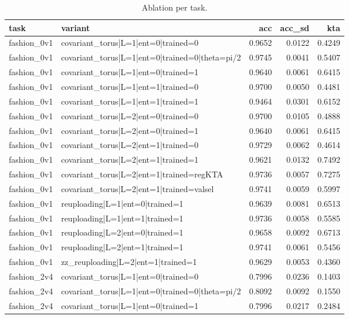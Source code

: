\begin{table}
\caption{Ablation per task.}
\label{tab:table3_ablation_per_task}
\begin{tabular}{llrrr}
\toprule
task & variant & acc & acc\_sd & kta \\
\midrule
fashion\_0v1 & covariant\_torus|L=1|ent=0|trained=0 & 0.9652 & 0.0122 & 0.4249 \\
fashion\_0v1 & covariant\_torus|L=1|ent=0|trained=0|theta=pi/2 & 0.9745 & 0.0041 & 0.5407 \\
fashion\_0v1 & covariant\_torus|L=1|ent=0|trained=1 & 0.9640 & 0.0061 & 0.6415 \\
fashion\_0v1 & covariant\_torus|L=1|ent=1|trained=0 & 0.9700 & 0.0050 & 0.4481 \\
fashion\_0v1 & covariant\_torus|L=1|ent=1|trained=1 & 0.9464 & 0.0301 & 0.6152 \\
fashion\_0v1 & covariant\_torus|L=2|ent=0|trained=0 & 0.9700 & 0.0105 & 0.4888 \\
fashion\_0v1 & covariant\_torus|L=2|ent=0|trained=1 & 0.9640 & 0.0061 & 0.6415 \\
fashion\_0v1 & covariant\_torus|L=2|ent=1|trained=0 & 0.9729 & 0.0062 & 0.4614 \\
fashion\_0v1 & covariant\_torus|L=2|ent=1|trained=1 & 0.9621 & 0.0132 & 0.7492 \\
fashion\_0v1 & covariant\_torus|L=2|ent=1|trained=regKTA & 0.9736 & 0.0057 & 0.7275 \\
fashion\_0v1 & covariant\_torus|L=2|ent=1|trained=valsel & 0.9741 & 0.0059 & 0.5997 \\
fashion\_0v1 & reuploading|L=1|ent=0|trained=1 & 0.9639 & 0.0081 & 0.6513 \\
fashion\_0v1 & reuploading|L=1|ent=1|trained=1 & 0.9736 & 0.0058 & 0.5585 \\
fashion\_0v1 & reuploading|L=2|ent=0|trained=1 & 0.9658 & 0.0092 & 0.6713 \\
fashion\_0v1 & reuploading|L=2|ent=1|trained=1 & 0.9741 & 0.0061 & 0.5456 \\
fashion\_0v1 & zz\_reuploading|L=2|ent=1|trained=1 & 0.9629 & 0.0053 & 0.4360 \\
fashion\_2v4 & covariant\_torus|L=1|ent=0|trained=0 & 0.7996 & 0.0236 & 0.1403 \\
fashion\_2v4 & covariant\_torus|L=1|ent=0|trained=0|theta=pi/2 & 0.8092 & 0.0092 & 0.1550 \\
fashion\_2v4 & covariant\_torus|L=1|ent=0|trained=1 & 0.7996 & 0.0217 & 0.2484 \\

\end{tabular}
\end{table}

